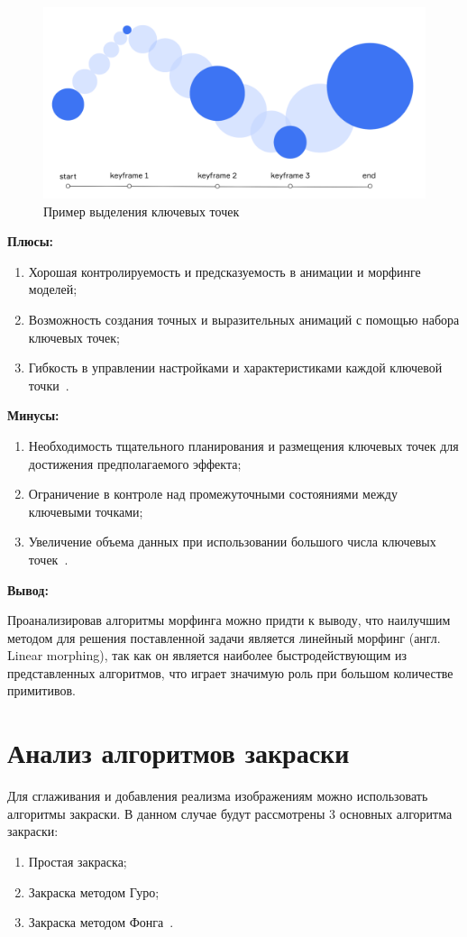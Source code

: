 \begin{figure}[H]
	\centering
	\includegraphics[scale=0.4]{images/key_frames.png}
	\caption{Пример выделения ключевых точек}
	\label{fig:key_frames}
\end{figure}


\textbf{Плюсы:}
\begin{enumerate}
	\item Хорошая контролируемость и предсказуемость в анимации и морфинге моделей;
	\item Возможность создания точных и выразительных анимаций с помощью набора ключевых точек;
	\item Гибкость в управлении настройками и характеристиками каждой ключевой точки~\cite{morphing_methods}.
\end{enumerate}

\textbf{Минусы:}
\begin{enumerate}
	\item Необходимость тщательного планирования и размещения ключевых точек для достижения предполагаемого эффекта;
	\item Ограничение в контроле над промежуточными состояниями между ключевыми точками;
	\item Увеличение объема данных при использовании большого числа ключевых точек~\cite{morphing_methods}.
\end{enumerate}

\textbf{Вывод:}

Проанализировав алгоритмы морфинга можно придти к выводу, что наилучшим методом для решения поставленной задачи является
линейный морфинг (англ. Linear morphing), так как он является наиболее быстродействующим из представленных алгоритмов, что играет значимую роль при большом количестве примитивов.


\section{Анализ алгоритмов закраски}
\label{sec:draw_algo_analysis}
Для сглаживания и добавления реализма изображениям можно использовать алгоритмы закраски.
В данном случае будут рассмотрены 3 основных алгоритма закраски:
\begin{enumerate}
	\item Простая закраска;
	\item Закраска методом Гуро;
	\item Закраска методом Фонга~\cite{draw_methods}.
\end{enumerate}


